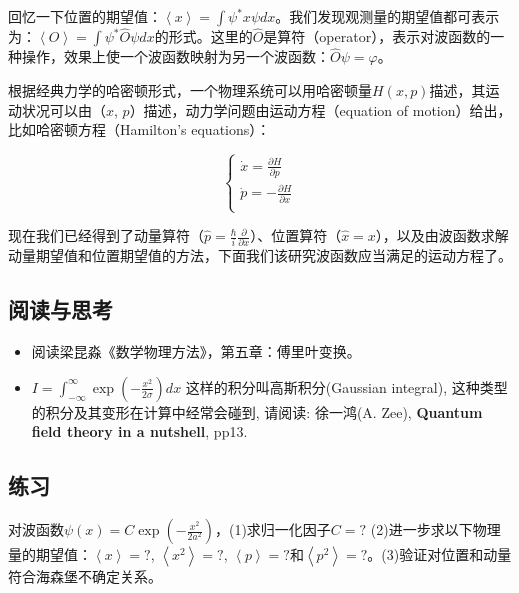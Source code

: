 回忆一下位置的期望值：$\left\langle x \right\rangle = \int \psi^* x
\psi dx$。我们发现观测量的期望值都可表示为：$\left\langle O
\right\rangle = \int \psi^* \hat O \psi dx$的形式。这里的$\hat
O$是算符（operator），表示对波函数的一种操作，效果上使一个波函数映射为另一个波函数：$\hat
O \psi = \varphi$。


根据经典力学的哈密顿形式，一个物理系统可以用哈密顿量$H(x,p)$描述，其运动状况可以由（$x$,
$p$）描述，动力学问题由运动方程（equation of motion）给出，比如哈密顿方程（Hamilton's equations）：


\begin{equation*}
    \left\{ \begin{array}{l}
 \dot x = \frac{{\partial H}}{{\partial p}} \\
 \dot p =  - \frac{{\partial H}}{{\partial x}} \\
 \end{array} \right.
\end{equation*}



现在我们已经得到了动量算符（$\hat p = \frac{\hbar}{i}
\frac{\partial}{\partial x}$）、位置算符（$\hat x =
x$），以及由波函数求解动量期望值和位置期望值的方法，下面我们该研究波函数应当满足的运动方程了。




\subsection*{阅读与思考}

\begin{itemize}
    \item 阅读梁昆淼《数学物理方法》，第五章：傅里叶变换。

\item $I = \int_{ - \infty }^\infty \exp \left( { - \frac{{x^2 }}{{2\sigma }}} \right) dx$
这样的积分叫高斯积分(Gaussian integral),
这种类型的积分及其变形在计算中经常会碰到, 请阅读: 徐一鸿(A. Zee),
\textbf{Quantum field theory in a nutshell}, pp13.

   \end{itemize}


\subsection*{练习}

对波函数$\psi(x) = C \exp \left( - \frac{x^2}{ 2 a^2} \right)$，(1)求归一化因子$C=?$ (2)进一步求以下物理量的期望值：$\left\langle x \right\rangle = ?$, $\left\langle x^2 \right\rangle = ?$, $\left\langle p \right\rangle = ?$和$\left\langle p^2 \right\rangle = ?$。(3)验证对位置和动量符合海森堡不确定关系。 